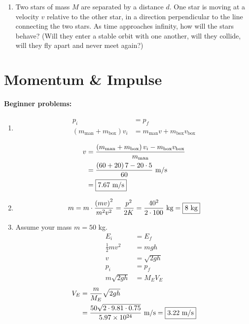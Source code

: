 \documentclass[12pt,letterpaper]{article}
\begin{document}
\begin{multicols}{2}
\begin{enumerate}
\item
Two stars of mass $M$ are separated by a distance $d$. One star is moving at a velocity $v$ relative to the other star, in a direction perpendicular to the line connecting the two stars. As time approaches infinity, how will the stars behave? (Will they enter a stable orbit with one another, will they collide, will they fly apart and never meet again?)
\end{enumerate}

\section{Momentum \& Impulse}

\paragraph{Beginner problems:}
\begin{enumerate}
\item \[
\begin{aligned}
p_i&=p_f\\
\left(m_{\text{man}}+m_{\text{box}}\right)v_i&=m_{\text{man}}v+m_{\text{box}}v_{\text{box}}\\
\end{aligned}
\] \[
\begin{aligned}
v&=\frac{\left(m_{\text{man}}+m_{\text{box}}\right)v_i-m_{\text{box}}v_{\text{box}}}{m_{\text{man}}}\\
 &=\frac{\left(60+20\right)7-20\cdot 5}{60}\ \text{m\slash s}\\
 &=\fbox{7.67 m\slash s}
\end{aligned}
\]

\item \[
m = m \cdot \frac{\left(mv\right)^2}{m^2v^2} = \frac{p^2}{2K} = \frac{40^2}{2\cdot 100}\ \text{kg} = \fbox{8 kg}
\]

\item Assume your mass $m=50$ kg.
\[
\begin{aligned}
E_i &= E_f\\
\frac{1}{2}mv^2 &= mgh\\
v &= \sqrt{2gh}\\
p_i &= p_f\\
m\sqrt{2gh} &= M_EV_E
\end{aligned}
\] \[
\begin{aligned}
V_E &= \frac{m}{M_E}\sqrt{2gh}\\
&= \frac{50\sqrt{2\cdot 9.81\cdot 0.75}}{5.97\times 10^{24}}\ \text{m\slash s} = \fbox{3.22 m\slash s}
\end{aligned}
\]
\end{enumerate}

\end{multicols}
\end{document}
